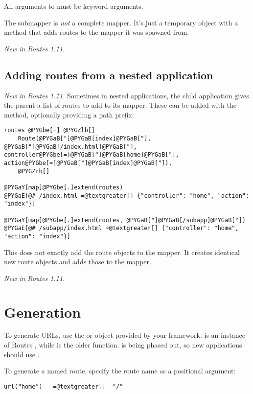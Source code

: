 \documentclass[letterpaper,10pt,english]{manual}
\begin{document}
All arguments to  must be keyword arguments.

The submapper is \emph{not} a complete mapper.  It's just a temporary object
with a  method that adds routes to the mapper it was spawned
from.

\emph{New in Routes 1.11.}


\subsection{Adding routes from a nested application}

\emph{New in Routes 1.11.}  Sometimes in nested applications, the child application
gives the parent a list of routes to add to its mapper.  These can be added
with the  method, optionally providing a path prefix:

\begin{Verbatim}[commandchars=@\[\]]
routes @PYGbe[=] @PYGZlb[]
    Route(@PYGaB["]@PYGaB[index]@PYGaB["], @PYGaB["]@PYGaB[/index.html]@PYGaB["], controller@PYGbe[=]@PYGaB["]@PYGaB[home]@PYGaB["], action@PYGbe[=]@PYGaB["]@PYGaB[index]@PYGaB["]),
    @PYGZrb[]

@PYGaY[map]@PYGbe[.]extend(routes)
@PYGaE[@# /index.html =@textgreater[] {"controller": "home", "action": "index"}]

@PYGaY[map]@PYGbe[.]extend(routes, @PYGaB["]@PYGaB[/subapp]@PYGaB["])
@PYGaE[@# /subapp/index.html =@textgreater[] {"controller": "home", "action": "index"}]
\end{Verbatim}

This does not exactly add the route objects to the mapper.  It creates
identical new route objects and adds those to the mapper.

\emph{New in Routes 1.11.}


\section{Generation}

To generate URLs, use the  or  object provided by your
framework.   is an instance of Routes , while
 is the older  function.   is being
phased out, so new applications should use .

To generate a named route, specify the route name as a positional argument:

\begin{Verbatim}[commandchars=@\[\]]
url("home")   =@textgreater[]  "/"
\end{Verbatim}
\end{document}
